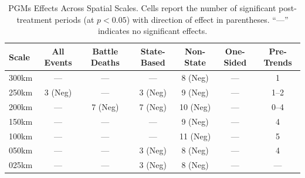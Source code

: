 \documentclass[11pt]{article}
\begin{document}
\begin{table}[H]
\centering
\caption{PGMs Effects Across Spatial Scales. Cells report the number of significant post-treatment periods (at $p<0.05$) with direction of effect in parentheses. ``---'' indicates no significant effects.}
\label{tab:pgms_robustness}
\begin{tabular}{lcccccc}
\toprule
Scale & All Events & Battle Deaths & State-Based & Non-State & One-Sided & Pre-Trends \\
\midrule
300km & ---       & ---           & ---         & 8 (Neg)   & ---       & 1          \\
250km & 3 (Neg)   & ---           & 3 (Neg)     & 9 (Neg)   & ---       & 1--2       \\
200km & ---       & 7 (Neg)       & 7 (Neg)     & 10 (Neg)  & ---       & 0--4       \\
150km & ---       & ---           & ---         & 9 (Neg)   & ---       & 4          \\
100km & ---       & ---           & ---         & 11 (Neg)  & ---       & 5          \\
050km & ---       & ---           & 3 (Neg)     & 8 (Neg)   & ---       & 4          \\
025km & ---       & ---           & 3 (Neg)     & 8 (Neg)   & ---       & ---        \\
\bottomrule
\end{tabular}
\end{table}
\end{document}
